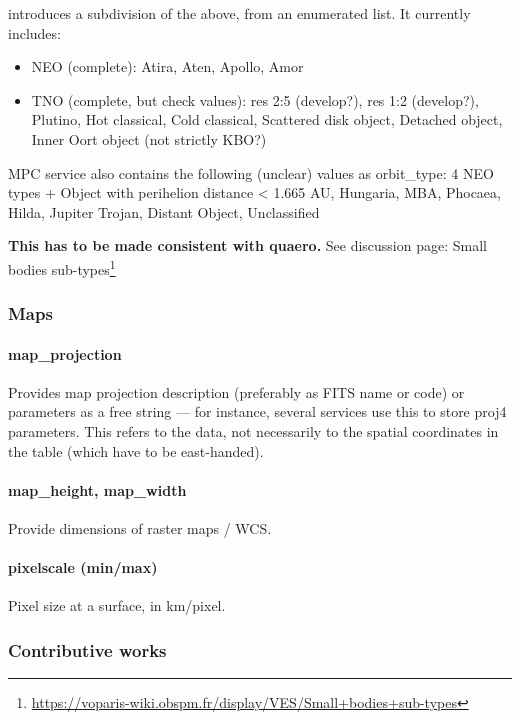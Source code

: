 \documentclass[11pt,a4paper]{ivoa}
\begin{document}
introduces a subdivision of the above, from an enumerated list.
It currently includes:

\begin{itemize}
\item NEO (complete): Atira, Aten, Apollo, Amor

\item TNO (complete, but check values):
res 2:5 (develop?), res 1:2 (develop?),
Plutino, Hot classical, Cold classical, Scattered disk object,
Detached object, Inner Oort object (not strictly KBO?)
\end{itemize}

MPC service also contains the following (unclear) values as orbit\_type:
4 NEO types + Object with perihelion distance < 1.665 AU, Hungaria, MBA,
Phocaea, Hilda, Jupiter Trojan, Distant Object, Unclassified

\textbf{This has to be made consistent with quaero.}
See discussion page:
Small bodies sub-types\footnote{\url{https://voparis-wiki.obspm.fr/display/VES/Small+bodies+sub-types}}

\subsubsection{Maps}

\paragraph{map\_projection}

Provides map projection description (preferably as FITS name or code)
or parameters as a free string — for instance, several services use
this to store proj4 parameters. This refers to the data, not necessarily
to the spatial coordinates in the table (which have to be east-handed).

\paragraph{map\_height, map\_width}

Provide dimensions of raster maps / WCS.

\paragraph{pixelscale (min/max)}

Pixel size at a surface, in km/pixel.

\subsubsection{Contributive works}
\end{document}
